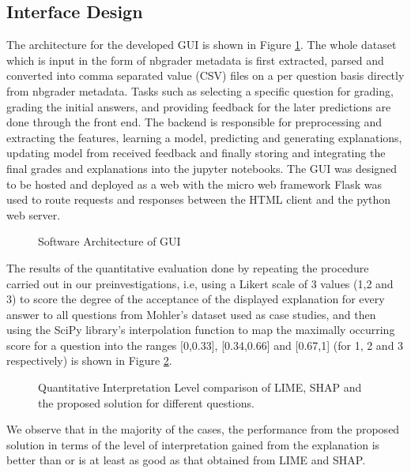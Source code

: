 \documentclass[letterpaper, 10 pt, conference]{ieeeconf}  %
\begin{document}
\subsection{Interface Design}

The architecture for the developed GUI is shown in Figure \ref{fig:arch}. The whole dataset which is input in the form of nbgrader metadata is first extracted, parsed and converted into comma separated value (CSV) files on a per question basis directly from nbgrader metadata. Tasks such as selecting a specific question for grading, grading the initial answers, and providing feedback for the later predictions are done through the front end. The backend is responsible for preprocessing and extracting the features, learning a model, predicting and generating explanations, updating model from received feedback and finally storing and integrating the final grades and explanations into the jupyter notebooks. The GUI was designed to be hosted and deployed as a web with the micro web framework Flask was used to route requests and responses between the HTML client and the python web server.
\begin{figure}[H]
\caption{Software Architecture of GUI}
\label{fig:arch}
\end{figure}
The results of the quantitative evaluation done by repeating the procedure carried out in our preinvestigations, i.e, using a Likert scale of 3 values (1,2 and 3) to score the degree of the acceptance of the displayed explanation for every answer to all questions from Mohler's dataset used as case studies, and then using the SciPy library’s interpolation function to map the maximally occurring score for a question into the ranges [0,0.33], [0.34,0.66] and [0.67,1] (for 1, 2 and 3 respectively) is shown in Figure \ref{fig:comparison2}.
\begin{figure}[H]
\caption{Quantitative Interpretation Level comparison of LIME, SHAP and the proposed solution for different questions.}
\label{fig:comparison2}
\end{figure}
We observe that in the majority of the cases, the performance from the proposed solution in terms of the level of interpretation gained from the explanation is better than or is at least as good as that obtained from LIME and SHAP.
\end{document}
